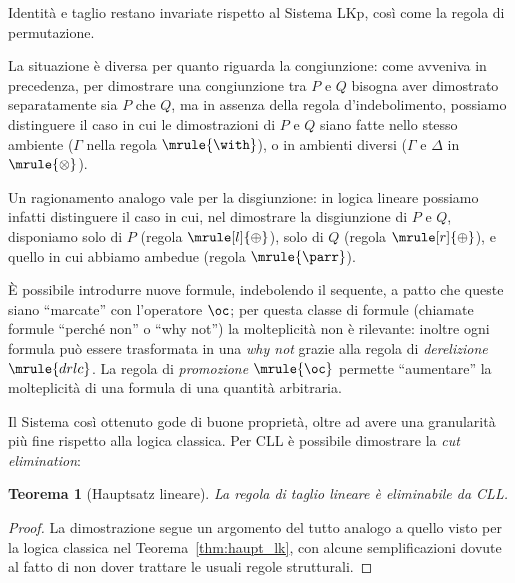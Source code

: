 \documentclass[12pt,a4paper,openright,twoside]{report}
\newtheorem{thm}{Teorema}[section]
\begin{document}
Identit\`a e taglio restano invariate rispetto al Sistema \textsf{LKp}, cos\`i come la regola di permutazione. 

La situazione \`e diversa per quanto riguarda la congiunzione: come avveniva in precedenza, per dimostrare una congiunzione tra $P$ e $Q$ bisogna aver dimostrato separatamente sia $P$ che $Q$, ma in assenza della regola d'indebolimento, possiamo distinguere il caso in cui le dimostrazioni di $P$ e $Q$ siano fatte nello stesso ambiente ($\Gamma$ nella regola $\mrule{\with}$), o in ambienti diversi ($\Gamma$ e $\Delta$ in $\mrule{\otimes}$).

Un ragionamento analogo vale per la disgiunzione: in logica lineare possiamo infatti distinguere il caso in cui, nel dimostrare la disgiunzione di $P$ e $Q$, disponiamo solo di $P$ (regola $\mrule[l]{\oplus}$), solo di $Q$ (regola $\mrule[r]{\oplus}$), e quello in cui abbiamo ambedue (regola $\mrule{\parr}$).

\`E possibile introdurre nuove formule, indebolendo il sequente, a patto che queste siano ``marcate'' con l'operatore $\oc$; per questa classe di formule (chiamate formule ``perch\'e non'' o ``why not'') la molteplicit\`a non \`e rilevante: inoltre ogni formula pu\`o essere trasformata in una \emph{why not} grazie alla regola di \emph{derelizione} $\mrule{drlc}$. La regola di \emph{promozione} $\mrule{\oc}$ permette ``aumentare'' la molteplicit\`a di una formula di una quantit\`a arbitraria.

Il Sistema cos\`i ottenuto gode di buone propriet\`a, oltre ad avere una granularit\`a pi\`u fine rispetto alla logica classica. Per \textsf{CLL} \`e possibile dimostrare la \emph{cut elimination}:
\begin{thm}[Hauptsatz lineare]
La regola di taglio lineare \`e eliminabile da \textsf{CLL}.
\end{thm}
\begin{proof}
La dimostrazione segue un argomento del tutto analogo a quello visto per la logica classica nel Teorema~\ref{thm:haupt_lk}, con alcune semplificazioni dovute al fatto di non dover trattare le usuali regole strutturali.
\end{proof}
\end{document}
